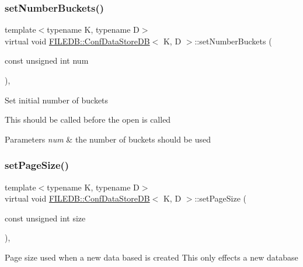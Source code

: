 \subsubsection{\texorpdfstring{setNumberBuckets()}{setNumberBuckets()}\hspace{0.1cm}{\footnotesize\ttfamily [3/3]}}
{\footnotesize\ttfamily template$<$typename K, typename D$>$ \\
virtual void \mbox{\hyperlink{classFILEDB_1_1ConfDataStoreDB}{F\+I\+L\+E\+D\+B\+::\+Conf\+Data\+Store\+DB}}$<$ K, D $>$\+::set\+Number\+Buckets (\begin{DoxyParamCaption}\item[{const unsigned int}]{num }\end{DoxyParamCaption})\hspace{0.3cm}{\ttfamily [inline]}, {\ttfamily [virtual]}}

Set initial number of buckets

This should be called before the open is called


\begin{DoxyParams}{Parameters}
{\em num} & the number of buckets should be used \\
\hline
\end{DoxyParams}
\mbox{\label{classFILEDB_1_1ConfDataStoreDB_a50004cb93881959d0846a12d920a95c8}} 
\subsubsection{\texorpdfstring{setPageSize()}{setPageSize()}\hspace{0.1cm}{\footnotesize\ttfamily [1/3]}}
{\footnotesize\ttfamily template$<$typename K, typename D$>$ \\
virtual void \mbox{\hyperlink{classFILEDB_1_1ConfDataStoreDB}{F\+I\+L\+E\+D\+B\+::\+Conf\+Data\+Store\+DB}}$<$ K, D $>$\+::set\+Page\+Size (\begin{DoxyParamCaption}\item[{const unsigned int}]{size }\end{DoxyParamCaption})\hspace{0.3cm}{\ttfamily [inline]}, {\ttfamily [virtual]}}

Page size used when a new data based is created This only effects a new database


